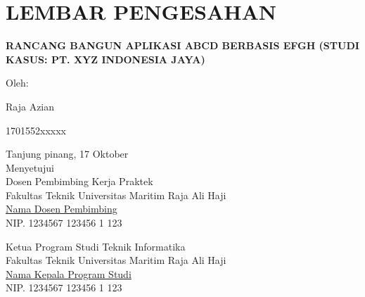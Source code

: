 \chapter*{\centering LEMBAR PENGESAHAN}

\thispagestyle{empty}


\begin{center}
    \textbf{RANCANG BANGUN APLIKASI ABCD BERBASIS EFGH (STUDI KASUS: PT. XYZ INDONESIA JAYA)}
\end{center}

\vspace{1cm}

\begin{center}
    Oleh:
    \begin{multicols}{2}
        {Raja Azian}

        {1701552xxxxx}
    \end{multicols}

    \vspace{1cm}

    Tanjung pinang, 17 Oktober \the\year{}\\
    Menyetujui\\
    Dosen Pembimbing Kerja Praktek \\
    Fakultas Teknik Universitas Maritim Raja Ali Haji \\
    \vspace{2cm}
    \underline{ Nama Dosen Pembimbing } \\
    NIP. 1234567 123456 1 123 \\

    \vspace{2.75cm}

    Ketua Program Studi Teknik Informatika \\
    Fakultas Teknik Universitas Maritim Raja Ali Haji \\
    \vspace{2cm}
    \underline{ Nama Kepala Program Studi } \\
    NIP. 1234567 123456 1 123 \\
\end{center}
\newpage